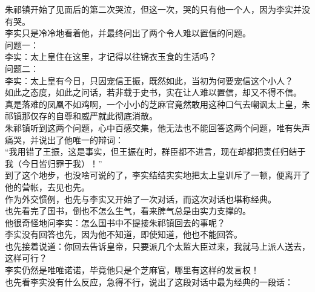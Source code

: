 \begin{multicols}{\theparacolNo}
朱祁镇开始了见面后的第二次哭泣，但这一次，哭的只有他一个人，因为李实并没有哭。\\

李实只是冷冷地看着他，并最终问出了两个令人难以置信的问题。\\

问题一：\\

李实：太上皇住在这里，才记得以往锦衣玉食的生活吗？\\

问题二：\\

李实：太上皇有今日，只因宠信王振，既然如此，当初为何要宠信这个小人？\\

如此之态度，如此之问话，若非载于史书，实在让人难以置信，却又不得不信。\\

真是落难的凤凰不如鸡啊，一个小小的芝麻官竟然敢用这种口气去嘲讽太上皇，朱祁镇那仅存的自尊和威严就此彻底消散。\\

朱祁镇听到这两个问题，心中百感交集，他无法也不能回答这两个问题，唯有失声痛哭，并说出了他唯一的辩词：\\

“我用错了王振，这是事实，但王振在时，群臣都不进言，现在却都把责任归结于我（今日皆归罪于我）！”\\

到了这个地步，也没啥可说的了，李实结结实实地把太上皇训斥了一顿，便离开了他的营帐，去见也先。\\

作为外交惯例，也先与李实又开始了一次对话，而这次对话也堪称经典。\\

也先看完了国书，倒也不怎么生气，看来脾气总是由实力支撑的。\\

他很奇怪地问李实：怎么国书中不提接朱祁镇回去的事呢？\\

李实没有回答也先，因为他不知道，即使知道，他也不能回答。\\

也先接着说道：你回去告诉皇帝，只要派几个太监大臣过来，我就马上派人送去，这样可行？\\

李实仍然是唯唯诺诺，毕竟他只是个芝麻官，哪里有这样的发言权！\\

也先看李实没有什么反应，急得不行，说出了这段对话中最为经典的一段话：\\


\end{multicols}
